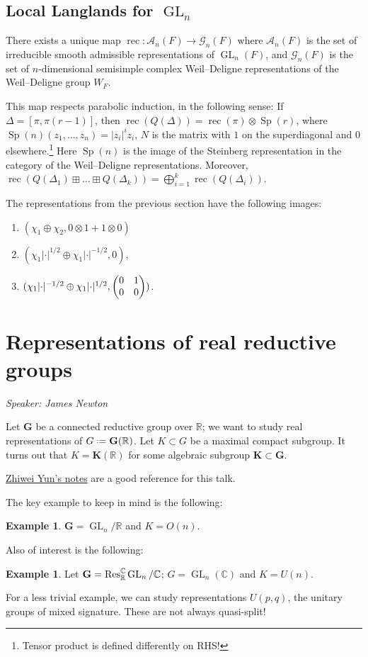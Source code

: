 \documentclass[11pt]{report}
\let\mc\mathcal
\let\mbf\mathbf
\newcommand{\1}{\mathbbm 1}
\newcommand{\R}{\mathbb{R}}
\newcommand{\C}{\mathbb{C}}
\newcommand*{\defeq}{\mathrel{\vcenter{\baselineskip0.5ex \lineskiplimit0pt
      \hbox{\scriptsize.}\hbox{\scriptsize.}}}%
  =}
\DeclareMathOperator{\rec}{rec}
\DeclareMathOperator{\Sp}{Sp}
\DeclareMathOperator{\GL}{GL}
\theoremstyle{plain}
\newcounter{ex}
\theoremstyle{definition}
\newtheorem{example}[thm]{Example}
\theoremstyle{remark}
\numberwithin{equation}{section}
\begin{document}
\subsection{Local Langlands for \texorpdfstring{$\GL_{n}$}{GLn}}

There exists a unique map $\rec \colon \mc A_{n}(F) \to \mc G_{n}(F)$
where $\mc A_{n}(F)$ is the set of irreducible smooth admissible
representations of $\GL_{n}(F)$, and $\mc G_{n}(F)$ is the set of
$n$-dimensional semisimple complex Weil--Deligne representations of the
Weil--Deligne group $W_{F}$.

This map respects parabolic induction, in the following sense: If
$\Delta = [\pi,\pi(r-1)]$, then
$\rec(Q(\Delta)) = \rec(\pi) \otimes \Sp(r)$, where
$\Sp(n)(z_{1},\ldots,z_{n}) = |z_{i}|^{i}z_{i}$, $N$ is the matrix with
$1$ on the superdiagonal and $0$ elsewhere.\footnote{Tensor product is
  defined differently on RHS!} Here $\Sp(n)$ is the image of the Steinberg representation in the category of the Weil--Deligne representations.
Moreover, $\rec(Q(\Delta_{1}) \boxplus \ldots \boxplus Q(\Delta_{k})) = \bigoplus_{i=1}^{k} \rec(Q(\Delta_{i}))$.

The representations from the previous section have the following images:
\begin{enumerate}
\item $(\chi_{1}\oplus \chi_{2}, 0\otimes 1 + 1 \otimes 0)$
\item $(\chi_{1}|{\cdot}|^{1/2}\oplus \chi_{1}|{\cdot}|^{-1/2}, 0)$, 
\item
  $(\chi_{1}|{\cdot}|^{-1/2}\oplus \chi_{1}|{\cdot}|^{1/2}, \mqty(0 & 1 \\ 0 & 0))$. 
\end{enumerate}

\section{Representations of real reductive groups}
\label{sec:real-groups}
\emph{Speaker: James Newton}


Let $\mbf G$ be a connected reductive group over $\R$; we want to
study real representations of $G \defeq \mbf G(\R)$. Let $K \subset G$ be a
maximal compact subgroup. It turns out that $K = \mbf K(\R)$ for some
algebraic subgroup $\mbf K \subset \mbf G$.

\href{http://virtualmath1.stanford.edu/~conrad/JLseminar/Notes/L6.pdf}{Zhiwei Yun's notes} are a good reference for this talk.

The key example to keep in mind is the following:
\begin{example}
  $\mbf G = \GL_{n}/\R$ and $K = O(n)$.
\end{example}
Also of interest is the following:
\begin{example}
  Let $\mbf G = \Res_{\R}^{\C} \GL_{n} / \C$; $G = \GL_{n}(\C)$ and $K
  = U(n)$. 
\end{example}
For a less trivial example, we can study representations  $U(p,q)$,
the unitary groups of mixed signature. These are not always
quasi-split!
\end{document}
